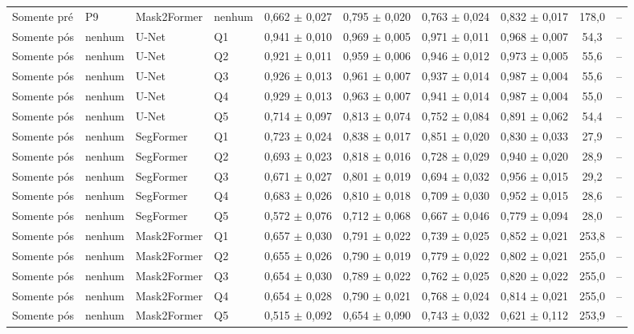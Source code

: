 {\begin{longtable}{llllcccccc}
Somente pré & P9 & Mask2Former & nenhum & 0,662 $\pm$ 0,027 & 0,795 $\pm$ 0,020 & 0,763 $\pm$ 0,024 & 0,832 $\pm$ 0,017 & 178,0 & -- \\
Somente pós & nenhum & U-Net & Q1 & 0,941 $\pm$ 0,010 & 0,969 $\pm$ 0,005 & 0,971 $\pm$ 0,011 & 0,968 $\pm$ 0,007 & 54,3 & -- \\
Somente pós & nenhum & U-Net & Q2 & 0,921 $\pm$ 0,011 & 0,959 $\pm$ 0,006 & 0,946 $\pm$ 0,012 & 0,973 $\pm$ 0,005 & 55,6 & -- \\
Somente pós & nenhum & U-Net & Q3 & 0,926 $\pm$ 0,013 & 0,961 $\pm$ 0,007 & 0,937 $\pm$ 0,014 & 0,987 $\pm$ 0,004 & 55,6 & -- \\
Somente pós & nenhum & U-Net & Q4 & 0,929 $\pm$ 0,013 & 0,963 $\pm$ 0,007 & 0,941 $\pm$ 0,014 & 0,987 $\pm$ 0,004 & 55,0 & -- \\
Somente pós & nenhum & U-Net & Q5 & 0,714 $\pm$ 0,097 & 0,813 $\pm$ 0,074 & 0,752 $\pm$ 0,084 & 0,891 $\pm$ 0,062 & 54,4 & -- \\
Somente pós & nenhum & SegFormer & Q1 & 0,723 $\pm$ 0,024 & 0,838 $\pm$ 0,017 & 0,851 $\pm$ 0,020 & 0,830 $\pm$ 0,033 & 27,9 & -- \\
Somente pós & nenhum & SegFormer & Q2 & 0,693 $\pm$ 0,023 & 0,818 $\pm$ 0,016 & 0,728 $\pm$ 0,029 & 0,940 $\pm$ 0,020 & 28,9 & -- \\
Somente pós & nenhum & SegFormer & Q3 & 0,671 $\pm$ 0,027 & 0,801 $\pm$ 0,019 & 0,694 $\pm$ 0,032 & 0,956 $\pm$ 0,015 & 29,2 & -- \\
Somente pós & nenhum & SegFormer & Q4 & 0,683 $\pm$ 0,026 & 0,810 $\pm$ 0,018 & 0,709 $\pm$ 0,030 & 0,952 $\pm$ 0,015 & 28,6 & -- \\
Somente pós & nenhum & SegFormer & Q5 & 0,572 $\pm$ 0,076 & 0,712 $\pm$ 0,068 & 0,667 $\pm$ 0,046 & 0,779 $\pm$ 0,094 & 28,0 & -- \\
Somente pós & nenhum & Mask2Former & Q1 & 0,657 $\pm$ 0,030 & 0,791 $\pm$ 0,022 & 0,739 $\pm$ 0,025 & 0,852 $\pm$ 0,021 & 253,8 & -- \\
Somente pós & nenhum & Mask2Former & Q2 & 0,655 $\pm$ 0,026 & 0,790 $\pm$ 0,019 & 0,779 $\pm$ 0,022 & 0,802 $\pm$ 0,021 & 255,0 & -- \\
Somente pós & nenhum & Mask2Former & Q3 & 0,654 $\pm$ 0,030 & 0,789 $\pm$ 0,022 & 0,762 $\pm$ 0,025 & 0,820 $\pm$ 0,022 & 255,0 & -- \\
Somente pós & nenhum & Mask2Former & Q4 & 0,654 $\pm$ 0,028 & 0,790 $\pm$ 0,021 & 0,768 $\pm$ 0,024 & 0,814 $\pm$ 0,021 & 255,0 & -- \\
Somente pós & nenhum & Mask2Former & Q5 & 0,515 $\pm$ 0,092 & 0,654 $\pm$ 0,090 & 0,743 $\pm$ 0,032 & 0,621 $\pm$ 0,112 & 253,9 & -- \\
\end{longtable}}
